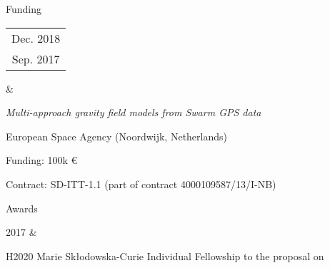 \documentclass[a4paper,12pt]{article}
\newcommand{\dynhref}[2]{%
  \iftoggle{expliciturl}{%
    #2 \footnote{\href{http://#1}{\detokenize{#1}}}%
  }{%
    \href{http://#1}{#2}%
  }%
}
\begin{document}


\begin{cvsection}{Funding}

\begin{tabular}{c}
Dec. 2018 \\
Sep. 2017 \\ 
\end{tabular} 
&
  \begin{itti}
    \item \emph{Multi-approach gravity field models from Swarm GPS data}
    \begin{ittib}
      \item European Space Agency (Noordwijk, Netherlands)
      \item Funding: 100k \euro
      \item Contract: SD-ITT-1.1 (part of contract 4000109587/13/I-NB)
    \end{ittib}
  \end{itti}

\end{cvsection}


\begin{cvsection}{Awards}

2017 &
  \begin{itti}
    \item H2020 Marie Sk\l{}odowska-Curie Individual Fellowship \dynhref{ec.europa.eu/research/soe/index.cfm?pg=what}{Seal of Excellent} to the proposal on \dynhref{jgte.github.io/permalinks/H2020_MSCA_IF_2017_Seal_of_Excellence-jgte.pdf}{\emph{Direct Gravimetric data assimilation into Geophysical models}}
  \end{itti}

\end{cvsection}

\end{document}
